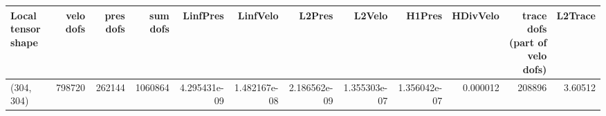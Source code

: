 \begin{tabular}{lrrrrrrrrrrr}
\toprule
Local tensor shape &  velo dofs &  pres dofs &  sum dofs &     LinfPres &     LinfVelo &       L2Pres &       L2Velo &       H1Pres &  HDivVelo &  trace dofs (part of velo dofs) &  L2Trace \\
\midrule
        (304, 304) &     798720 &     262144 &   1060864 & 4.295431e-09 & 1.482167e-08 & 2.186562e-09 & 1.355303e-07 & 1.356042e-07 &  0.000012 &                          208896 &  3.60512 \\
\bottomrule
\end{tabular}
